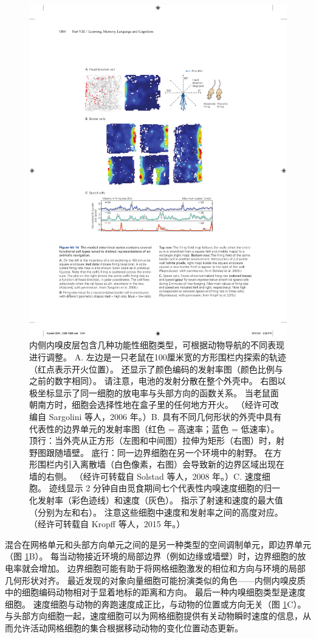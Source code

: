 \begin{figure}[htbp]
	\centering
	\includegraphics[width=0.7\linewidth]{chap54/fig_54_14}
	\caption{内侧内嗅皮层包含几种功能性细胞类型，可根据动物导航的不同表现进行调整。 A. 左边是一只老鼠在100厘米宽的方形围栏内探索的轨迹（红点表示开火位置）。 还显示了颜色编码的发射率图（颜色比例与之前的数字相同）。 请注意，电池的发射分散在整个外壳中。 右图以极坐标显示了同一细胞的放电率与头部方向的函数关系。 当老鼠面朝南方时，细胞会选择性地在盒子里的任何地方开火。 （经许可改编自 Sargolini 等人，2006 年。）B. 具有不同几何形状的外壳中具有代表性的边界单元的发射率图（红色 = 高速率；蓝色 = 低速率）。 顶行：当外壳从正方形（左图和中间图）拉伸为矩形（右图）时，射野图跟随墙壁。 底行：同一边界细胞在另一个环境中的射野。 在方形围栏内引入离散墙（白色像素，右图）会导致新的边界区域出现在墙的右侧。 （经许可转载自 Solstad 等人，2008 年。）C. 速度细胞。 迹线显示 2 分钟自由觅食期间七个代表性内嗅速度细胞的归一化发射率（彩色迹线）和速度（灰色）。 指示了射速和速度的最大值（分别为左和右）。 注意这些细胞中速度和发射率之间的高度对应。 （经许可转载自 Kropff 等人，2015 年。）}
	\label{fig:54_14}
\end{figure}


混合在网格单元和头部方向单元之间的是另一种类型的空间调制单元，即边界单元（图 \ref{fig:54_14}B）。
每当动物接近环境的局部边界（例如边缘或墙壁）时，边界细胞的放电率就会增加。
边界细胞可能有助于将网格细胞激发的相位和方向与环境的局部几何形状对齐。
最近发现的对象向量细胞可能扮演类似的角色——内侧内嗅皮质中的细胞编码动物相对于显着地标的距离和方向。
最后一种内嗅细胞类型是速度细胞。
速度细胞与动物的奔跑速度成正比，与动物的位置或方向无关（图 \ref{fig:54_14}C）。
与头部方向细胞一起，速度细胞可以为网格细胞提供有关动物瞬时速度的信息，从而允许活动网格细胞的集合根据移动动物的变化位置动态更新。


